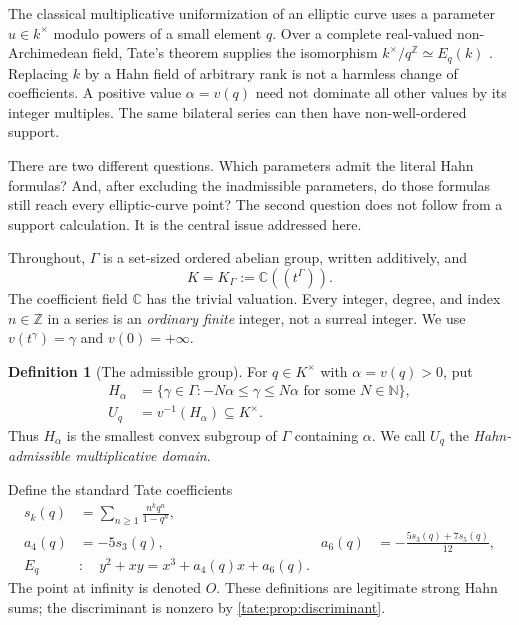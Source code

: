\documentclass[11pt,letterpaper]{article}
\theoremstyle{definition}
\newtheorem{definition}[definition]{Definition}
\newcommand{\C}{\mathbb C}
\newcommand{\Z}{\mathbb Z}
\newcommand{\N}{\mathbb N}
\newcommand{\K}[1]{\C((t^{#1}))}
\begin{document}
The classical multiplicative uniformization of an elliptic curve uses a
parameter $u\in k^\times$ modulo powers of a small element $q$. Over a
complete real-valued non-Archimedean field, Tate's theorem supplies the
isomorphism $k^\times/q^\Z\simeq E_q(k)$ \cite{Tate,Silverman}.
Replacing $k$ by a Hahn field of arbitrary rank is not a harmless change
of coefficients. A positive value $\alpha=v(q)$ need not dominate all
other values by its integer multiples. The same bilateral series can then
have non-well-ordered support.

There are two different questions. Which parameters admit the literal
Hahn formulas? And, after excluding the inadmissible parameters, do those
formulas still reach every elliptic-curve point? The second question does
not follow from a support calculation. It is the central issue addressed
here.

Throughout, $\Gamma$ is a set-sized ordered abelian group, written
additively, and
\[
 K=K_\Gamma:=\K{\Gamma}.
\]
The coefficient field $\C$ has the trivial valuation. Every integer,
degree, and index $n\in\Z$ in a series is an \emph{ordinary finite}
integer, not a surreal integer. We use $v(t^\gamma)=\gamma$ and
$v(0)=+\infty$.

\begin{definition}[The admissible group]\label{tate:def:domain}
For $q\in K^\times$ with $\alpha=v(q)>0$, put
\begin{align}
 H_\alpha&=\{\gamma\in\Gamma: -N\alpha\le\gamma\le N\alpha
                    \text{ for some }N\in\N\},\label{tate:eq:H}\\
 U_q&=v^{-1}(H_\alpha)\subseteq K^\times.\label{tate:eq:U}
\end{align}
Thus $H_\alpha$ is the smallest convex subgroup of $\Gamma$ containing
$\alpha$. We call $U_q$ the \emph{Hahn-admissible multiplicative domain}.
\end{definition}

Define the standard Tate coefficients
\begin{align}
 s_k(q)&=\sum_{n\ge1}\frac{n^kq^n}{1-q^n},\label{tate:eq:sk}\\
 a_4(q)&=-5s_3(q),&
 a_6(q)&=-\frac{5s_3(q)+7s_5(q)}{12},\label{tate:eq:ak}\\
 E_q&:\quad y^2+xy=x^3+a_4(q)x+a_6(q).\label{tate:eq:curve}
\end{align}
The point at infinity is denoted $O$. These definitions are legitimate
strong Hahn sums; the discriminant is nonzero by \cref{tate:prop:discriminant}.
\end{document}
